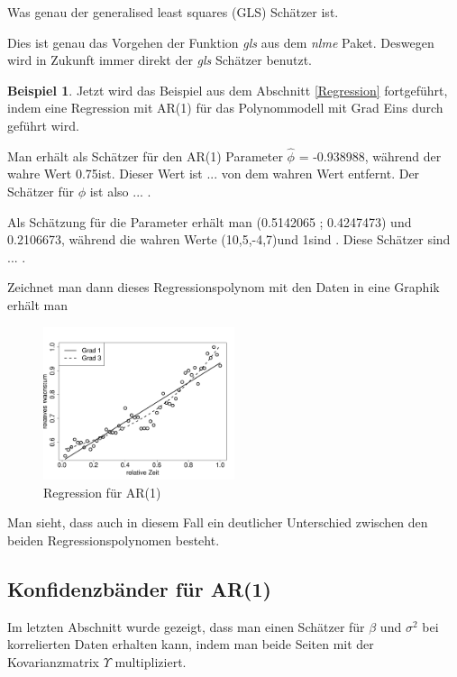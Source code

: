 \documentclass[12pt,a4paper]{article}
\theoremstyle{definition}
\newtheorem{Beispiel}[Definition]{Beispiel}
\theoremstyle{definition}
\theoremstyle{definition}
\theoremstyle{definition}
\newcommand{\betatrue}{(10,5,-4,7)}
\newcommand{\phitrue}{0.75}
\newcommand{\sigmatrue}{1}
\newcommand{\betaARone}{ (0.5142065 ; 0.4247473) }
\newcommand{\sigmaARone}{0.2106673}
\newcommand{\phiestone}{-0.938988}
\begin{document}
Was genau der generalised least squares (GLS) Schätzer ist.

Dies ist genau das Vorgehen der Funktion \textit{gls} aus dem \textit{nlme} Paket. Deswegen wird in Zukunft immer direkt der \textit{gls} Schätzer benutzt.

\begin{Beispiel}
Jetzt wird das Beispiel aus dem Abschnitt \ref{Regression} fortgeführt, indem eine Regression mit AR(1) für das Polynommodell mit Grad Eins durch geführt wird. 

Man erhält als Schätzer für den AR(1) Parameter $\hat{\phi}$ = \phiestone , während der wahre Wert \phitrue ist. Dieser Wert ist ... von dem wahren Wert entfernt. Der Schätzer für $\phi$ ist also ... .

Als Schätzung für die Parameter erhält man \betaARone und \sigmaARone , während die wahren Werte \betatrue und \sigmatrue sind . Diese Schätzer sind ... .


Zeichnet man dann dieses Regressionspolynom mit den Daten in eine Graphik erhält man

\begin{figure}[H] 
  \centering
     \includegraphics[width=0.5\textwidth]{Bsp-Reg-AR}
  \caption{Regression für AR(1)}
  \label{BSP-Reg-AR}
\end{figure}

Man sieht, dass auch in diesem Fall ein deutlicher Unterschied zwischen den beiden Regressionspolynomen besteht.

\end{Beispiel}




\subsection{Konfidenzbänder für AR(1)}
\label{Konfidenzbaender für AR(1)}
Im letzten Abschnitt wurde gezeigt, dass man einen Schätzer für $\beta$ und $\sigma^2$ bei korrelierten Daten erhalten kann, indem man beide Seiten mit der Kovarianzmatrix $\Upsilon$ multipliziert. 
\end{document}
